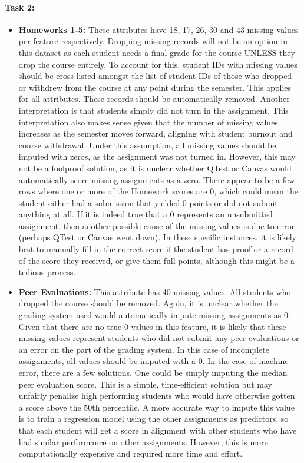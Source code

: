 \documentclass{article}
\begin{document}
\paragraph{\textbf{Task 2:}} 
\begin{itemize}
    \item \textbf{Homeworks 1-5:} These attributes have 18, 17, 26, 30 and 43 missing values per feature respectively. Dropping missing records will not be an option in this dataset as each student needs a final grade for the course UNLESS they drop the course entirely. To account for this, student IDs with missing values should be cross listed amongst the list of student IDs of those who dropped or withdrew from the course at any point during the semester. This applies for all attributes. These records should be automatically removed. Another interpretation is that students simply did not turn in the assignment. This interpretation also makes sense given that the number of missing values increases as the semester moves forward, aligning with student burnout and course withdrawal. Under this assumption, all missing values should be imputed with zeros, as the assignment was not turned in. However, this may not be a foolproof solution, as it is unclear whether QTest or Canvas would automatically score missing assignments as a zero. There appear to be a few rows where one or more of the Homework scores are 0, which could mean the student either had a submission that yielded 0 points or did not submit anything at all. If it is indeed true that a 0 represents an unsubmitted assignment, then another possible cause of the missing values is due to error (perhaps QTest or Canvas went down). In these specific instances, it is likely best to manually fill in the correct score if the student has proof or a record of the score they received, or give them full points, although this might be a tedious process. 
    \item \textbf{Peer Evaluations:} This attribute has 40 missing values. All students who dropped the course should be removed. Again, it is unclear whether the grading system used would automatically impute missing assignments as 0. Given that there are no true 0 values in this feature, it is likely that these missing values represent students who did not submit any peer evaluations or an error on the part of the grading system. In this case of incomplete assignments, all values should be imputed with a 0. In the case of machine error, there are a few solutions. One could be simply imputing the median peer evaluation score. This is a simple, time-efficient solution but may unfairly penalize high performing students who would have otherwise gotten a score above the 50th percentile. A more accurate way to impute this value is to train a regression model using the other assignments as predictors, so that each student will get a score in alignment with other students who have had similar performance on other assignments. However, this is more computationally expensive and required more time and effort.

\end{itemize}
\end{document}
